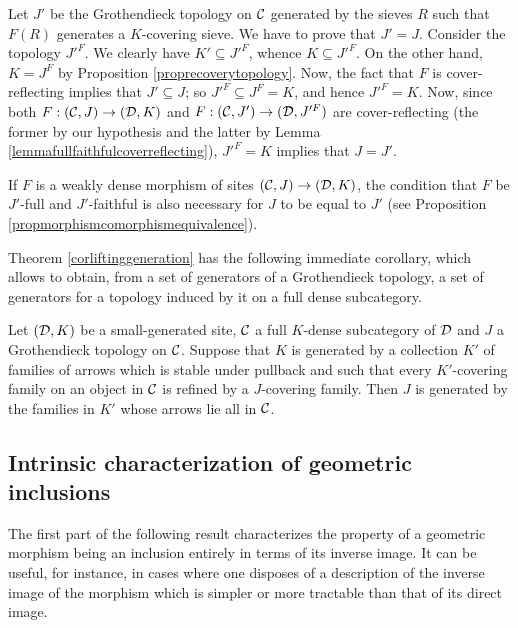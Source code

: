 \documentclass[a4paper,12pt]{article}
\begin{document}
\begin{proofs}
Let $J'$ be the Grothendieck topology on $\cal C$ generated by the sieves $R$ such that $F(R)$ generates a $K$-covering sieve. We have to prove that $J'=J$. Consider the topology $J'^{F}$. We clearly have $K'\subseteq J'^{F}$, whence $K\subseteq J'^{F}$. On the other hand, $K=J^{F}$ by Proposition \ref{proprecoverytopology}.  Now, the fact that $F$ is cover-reflecting implies that $J'\subseteq J$; so $J'^{F}\subseteq J^{F}=K$, and hence $J'^{F}=K$. Now, since both $F:({\cal C}, J)\to ({\cal D}, K)$ and $F:({\cal C}, J')\to ({\cal D}, J'^{F})$ are cover-reflecting (the former by our hypothesis and the latter by Lemma \ref{lemmafullfaithfulcoverreflecting}), $J'^{F}=K$ implies that $J=J'$.
\end{proofs}

\begin{remark}
	If $F$ is a weakly dense morphism of sites $({\cal C}, J)\to ({\cal D}, K)$, the condition that $F$ be $J'$-full and $J'$-faithful is also necessary for $J$ to be equal to $J'$ (see Proposition \ref{propmorphismcomorphismequivalence}).  
\end{remark}

Theorem \ref{corliftinggeneration} has the following immediate corollary, which allows to obtain, from a set of generators of a Grothendieck topology, a set of generators for a topology induced by it on a full dense subcategory.

\begin{corollary}\label{corgensep}
	Let $({\cal D}, K)$ be a small-generated site, $\cal C$ a full $K$-dense subcategory of $\cal D$ and $J$ a Grothendieck topology on $\cal C$. Suppose that $K$ is generated by a collection $K'$ of families of arrows which is stable under pullback and such that every $K'$-covering family on an object in $\cal C$ is refined by a $J$-covering family. Then $J$ is generated by the families in $K'$ whose arrows lie all in $\cal C$. 	
\end{corollary}

\subsection{Intrinsic characterization of geometric inclusions}\label{sec:intrinsiccharinclusions}

The first part of the following result characterizes the property of a geometric morphism being an inclusion entirely in terms of its inverse image. It can be useful, for instance, in cases where one disposes of a description of the inverse image of the morphism which is simpler or more tractable than that of its direct image.	
\end{document}
